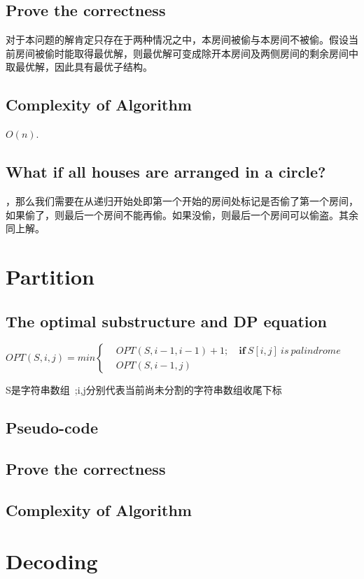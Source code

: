 \documentclass{article}
\begin{document}
\begin{CJK*}{UTF8}{gbsn}
	\subsection{Prove the correctness}
		\quad\quad 对于本问题的解肯定只存在于两种情况之中，本房间被偷与本房间不被偷。假设当前房间被偷时能取得最优解，则最优解可变成除开本房间及两侧房间的剩余房间中取最优解，因此具有最优子结构。
	\subsection{Complexity of Algorithm}
		\quad\quad	$O(n)$.
	\subsection{What if all houses are arranged in a circle?}
		\quad{}，那么我们需要在从递归开始处即第一个开始的房间处标记是否偷了第一个房间，如果偷了，则最后一个房间不能再偷。如果没偷，则最后一个房间可以偷盗。其余同上解。
		
\clearpage
\section{Partition}
	\subsection{The optimal substructure and DP equation}
	\quad
		$
		OPT(S,i,j) = min 
		\left\{
		\begin{aligned}
		&OPT(S,i-1,i-1) +1; \quad \textbf{if}\ S[i,j]\ is\ palindrome\\
		&OPT(S,i-1,j)
		\end{aligned} 	
		\right. 
		$
		
		\quad
		S是字符串数组\ ;i,j分别代表当前尚未分割的字符串数组收尾下标
	\subsection{Pseudo-code}
	\subsection{Prove the correctness}
	\subsection{Complexity of Algorithm}

\clearpage
\section{Decoding}

\end{CJK*}
\end{document}
